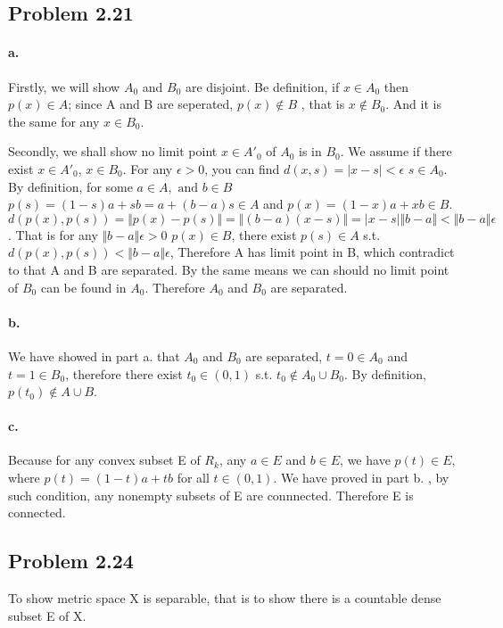 \documentclass{article}
\begin{document}
\subsection*{Problem 2.21}

\paragraph{a.}
Firstly, we will show $ A_0 $ and $ B_0 $ are disjoint. Be definition, if $ x \in A_0 $ then $ p(x) \in A$; since A and B are seperated, $ p(x) \not\in B$ , that is $ x \not\in B_0$. And it is the same for any $x \in B_0$.

Secondly, we shall show no limit point $ x \in A'_0 $ of $ A_0$ is in $B_0$.
We assume if there exist $ x \in A'_0 $, $ x \in B_0 $. For any $\epsilon > 0$, you can find $ d(x,s) = \vert x - s \vert< \epsilon $ $ s \in A_0$.
By definition, for some $ a \in A,\text{ and }b \in B $ $ p(s) = (1-s) a + sb = a + (b-a)s \in A $ and $p(x) = (1-x)a+xb \in B$.
$d(p(x),p(s)) = \Vert p(x)-p(s) \Vert = \Vert (b-a)(x-s) \Vert = \vert x-s \vert \Vert b-a \Vert < \Vert b-a \Vert \epsilon $.
That is for any $\Vert b-a \Vert \epsilon > 0$ $ p(x)\in B $, there exist $p(s) \in A$ s.t. $ d(p(x),p(s)) < \Vert b-a \Vert \epsilon $, Therefore A has limit point in B, which contradict to that A and B are separated.
By the same means we can should no limit point of $B_0$ can be found in $A_0$.
Therefore $ A_0 $ and $ B_0 $ are separated.

\paragraph{b.} We have showed in part a. that $ A_0 $ and $ B_0 $ are separated, $ t = 0 \in A_0 $ and $ t = 1 \in B_0$, therefore  there exist $t_0 \in (0,1)$ s.t. $ t_0  \not\in A_0 \cup B_0$.
By definition, $p(t_0) \not\in A \cup B$.

\paragraph{c.} Because for any convex subset E of $R_k$, any $a \in E$ and $b \in E$, we have $p(t) \in E$, where $p(t) = (1-t)a +tb$ for all $t \in (0,1)$.
We have proved in part b. , by such condition, any nonempty subsets of E are connnected. Therefore E is connected.

\subsection*{Problem 2.24}
To show metric space X is separable, that is to show there is a countable dense subset E of X.
\end{document}
